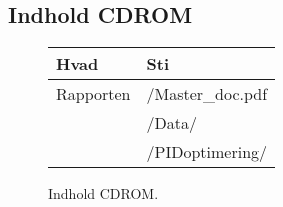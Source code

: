 \newpage

\tableofcontents
\listoffigures
\listoftables  

\subsection*{Indhold CDROM}
\begin{figure}[th!]
\centering
\begin{tabular}{l|l}
Hvad&Sti\\\hline
Rapporten&/Master\_doc.pdf\\
&/Data/\\
&/PIDoptimering/\\

\end{tabular}
\captionsetup{type=table}
\caption*{Indhold CDROM.}
\label{tb:CD}
\end{figure}


\newpage
\listoftodos